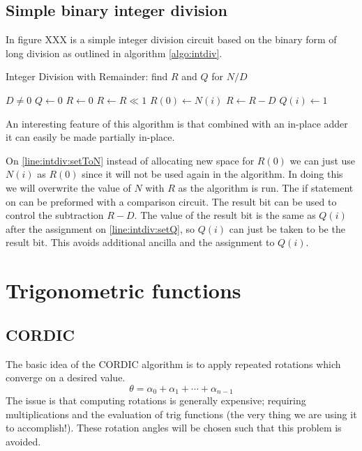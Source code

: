   \subsection{Simple binary integer division}
    In figure XXX is a simple integer division circuit based on the binary form of long division as outlined in algorithm \ref{algo:intdiv}.
    \begin{program}
      \capstart
      \caption{Integer Division with Remainder: find $R$ and $Q$ for $N/D$}
      \begin{algorithmic}[1]
        \Require $D \neq 0$
        \State $Q \gets 0$
        \State $R \gets 0$
          \State $R \gets R \ll 1$
          \State $R(0) \gets N(i)$ \label{line:intdiv:setToN}
           \label{line:intdiv:compare}
            \State $R\gets R - D$
            \State $Q(i) \gets 1$ \label{line:intdiv:setQ}

          \EndIf
        \EndFor
      \end{algorithmic}
      \label{algo:intdiv}
    \end{program}
    An interesting feature of this algorithm is that combined with an in-place adder\cite{CDKM:2004} it can easily be made partially in-place.

    On \cref{line:intdiv:setToN} instead of allocating new space for $R(0)$ we can just use $N(i)$ as $R(0)$ since it will not be used again in the algorithm.
    In doing this we will overwrite the value of $N$ with $R$ as the algorithm is run.
    The if statement on  can be preformed with a comparison circuit.
    The result bit can be used to control the subtraction $R-D$.
    The value of the result bit is the same as $Q(i)$ after the assignment on \ref{line:intdiv:setQ}, so $Q(i)$ can just be taken to be the result bit.
    This avoids additional ancilla and the assignment to $Q(i)$.


\section{Trigonometric functions}
    \subsection{CORDIC}
        The basic idea of the CORDIC\cite{V:1959} algorithm is to apply repeated rotations which converge on a desired value.
        \[ \theta = \alpha_0 + \alpha_1 + \dotsb + \alpha_{n-1} \]
        The issue is that computing rotations is generally expensive;
        requiring multiplications and the evaluation of trig functions (the very thing we are using it to accomplish!).
        These rotation angles will be chosen such that this problem is avoided.

